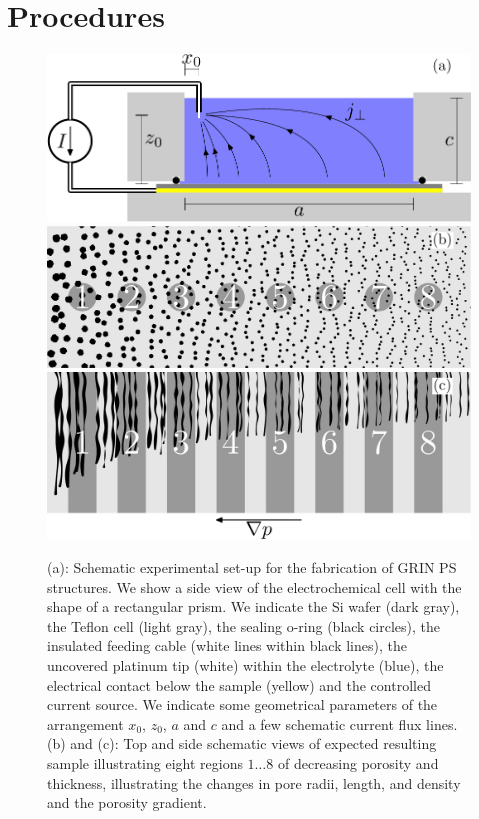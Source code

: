 \documentclass[review,sort&compress]{cas-sc}
\begin{document}
\section{Procedures}
\label{sec:procedures}
\begin{figure}
  \centering
  \includegraphics[width=.8\textwidth]{fig4a}\\[12pt]
  \includegraphics[width=.8\textwidth]{fig4b}\\[12pt]
  \includegraphics[width=.8\textwidth]{fig4c}

  \caption{(a): Schematic experimental set-up for
    the fabrication of GRIN PS structures. We show a side view of the
    electrochemical cell with the shape of a
    rectangular prism. We indicate the Si wafer (dark
    gray), the Teflon cell (light gray), the sealing o-ring (black
    circles), the insulated feeding cable (white lines within black
    lines), the uncovered platinum tip (white) within the
    electrolyte (blue), the electrical contact below the sample
    (yellow) and the controlled current source. We indicate some geometrical
    parameters of the arrangement $x_0$, $z_0$, $a$ and $c$
    and a few schematic current flux
    lines. (b) and (c): Top and side schematic views of expected resulting sample
    illustrating eight regions $1\ldots8$ of decreasing porosity and thickness,
    illustrating the changes in pore radii,
    length, and density and the porosity gradient.}
  \label{fig:DE1}
\end{figure}
\end{document}
